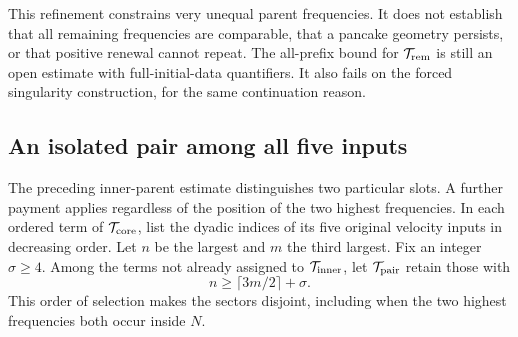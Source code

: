 \documentclass[11pt]{article}
\begin{document}
This refinement constrains very unequal parent frequencies. It does
not establish that all remaining frequencies are comparable, that a
pancake geometry persists, or that positive renewal cannot repeat.
The all-prefix bound for $\mathcal T_{\rm rem}$ is still an open
estimate with full-initial-data quantifiers. It also fails on the
forced singularity construction, for the same continuation reason.

\subsection{An isolated pair among all five inputs}

The preceding inner-parent estimate distinguishes two particular slots.
A further payment applies regardless of the position of the two highest
frequencies. In each ordered term of $\mathcal T_{\rm core}$, list the
dyadic indices of its five original velocity inputs in decreasing order.
Let $n$ be the largest and $m$ the third largest. Fix an integer
$\sigma\geq4$. Among the terms not already assigned to
$\mathcal T_{\rm inner}$, let $\mathcal T_{\rm pair}$ retain those with
\[
 n\geq\lceil3m/2\rceil+\sigma.
\]
This order of selection makes the sectors disjoint, including when the
two highest frequencies both occur inside $N$.
\end{document}
